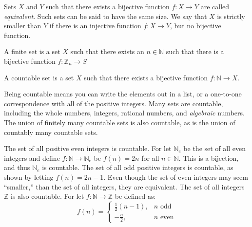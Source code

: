                 Sets $X$ and $Y$ such that there
                exists a bijective function $f:X\rightarrow{Y}$ are
                called \textit{equivalent}. Such sets can be said
                to have the same size. We say that $X$ is strictly
                smaller than $Y$ if there is an injective function
                $f:X\rightarrow{Y}$, but no bijective function.
            \begin{definition}
                A finite set is a set $X$ such that there
                exists an $n\in\mathbb{N}$ such that there is
                a bijective function
                $f:\mathbb{Z}_{n}\rightarrow{S}$
            \end{definition}
            \begin{definition}
                A countable set is a set
                $X$ such that there exists a bijective
                function $f:\mathbb{N}\rightarrow{X}$.
            \end{definition}
            Being countable means you can write
            the elements out in a list, or a
            one-to-one correspondence with all of
            the positive integers. Many sets are countable,
            including the whole numbers, integers, rational
            numbers, and \textit{algebraic} numbers. The
            union of finitely many countable sets is also
            countable, as is the union of countably many
            countable sets.
            \begin{example}
                The set of all positive even integers is
                countable. For let $\mathbb{N}_{e}$ be the
                set of all even integers and define
                $f:\mathbb{N}\rightarrow\mathbb{N}_{e}$ be
                $f(n)=2n$ for all $n\in\mathbb{N}$. This is
                a bijection, and thus $\mathbb{N}_{e}$ is
                countable. The set of all odd positive integers
                is countable, as shown by letting
                $f(n)=2n-1$. Even though the set of even
                integers may seem ``smaller,'' than the set of
                all integers, they are equivalent. The set of
                all integers $\mathbb{Z}$ is also countable.
                For let $f:\mathbb{N}\rightarrow\mathbb{Z}$
                be defined as:
                \begin{equation}
                    f(n)=
                    \begin{cases}
                        \frac{1}{2}(n-1),&n\textrm{ odd}\\
                        -\frac{n}{2},&n\textrm{ even}
                    \end{cases}
                \end{equation}
            \end{example}
